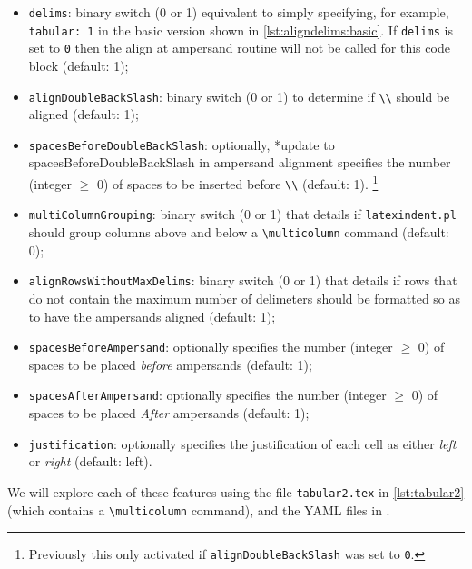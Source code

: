 	\begin{itemize}
		\item \texttt{delims}: binary switch (0 or 1) equivalent to simply specifying, for
		      example, \texttt{tabular: 1} in the basic version shown in \cref{lst:aligndelims:basic}. If
		      \texttt{delims} is set to \texttt{0} then the align at ampersand
		      routine will not be called for this code block (default: 1);
		\item \texttt{alignDoubleBackSlash}: binary switch (0 or 1) to determine if \lstinline!\\!
		      should be aligned (default: 1);
		\item \texttt{spacesBeforeDoubleBackSlash}: optionally,%
		      *{update to spacesBeforeDoubleBackSlash in ampersand alignment} specifies the number (integer $\geq$ 0) of spaces
		      to be inserted before \lstinline!\\! (default: 1). \footnote{Previously this only activated if \texttt{alignDoubleBackSlash} was set to \texttt{0}.}
		\item {} \texttt{multiColumnGrouping}: binary switch (0 or 1) that details if
		      \texttt{latexindent.pl} should group columns
		      above and below a \lstinline!\multicolumn! command (default: 0);
		\item {} \texttt{alignRowsWithoutMaxDelims}: binary switch (0 or 1) that details if
		      rows that do not contain the maximum number of delimeters should be formatted so as to
		      have the ampersands aligned (default: 1);
		\item {}\texttt{spacesBeforeAmpersand}: optionally specifies the number (integer
		      $\geq$ 0) of
		      spaces to be placed \emph{before} ampersands (default: 1);
		\item {}\texttt{spacesAfterAmpersand}: optionally specifies the number (integer
		      $\geq$ 0) of
		      spaces to be placed \emph{After} ampersands (default: 1);
		\item {}\texttt{justification}: optionally specifies the justification of
		      each cell as either \emph{left} or \emph{right} (default: left).
	\end{itemize}

	We will explore each of these features using the file \texttt{tabular2.tex} in
	\cref{lst:tabular2} (which contains a \lstinline!\multicolumn! command), and the YAML files in .

